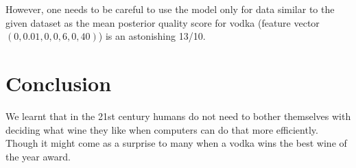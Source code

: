 \documentclass[a4paper,11pt]{article}
\begin{document}
However, one needs to be careful to use the model only for data similar to the given dataset as the mean posterior quality score for vodka (feature vector $(0, 0.01, 0, 0, 6, 0, 40)$) is an astonishing 13/10.

\section{Conclusion}
We learnt that in the 21st century humans do not need to bother themselves with deciding what wine they like when computers can do that more efficiently. Though it might come as a surprise to many when a vodka wins the best wine of the year award.



\end{document}
